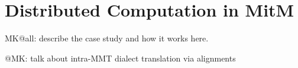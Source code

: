 \section{Distributed Computation in MitM}\label{sec:case}
\begin{todolist}{MK@all: describe the case study and how it works here.}
\item @MK: talk about intra-MMT dialect translation via alignments 
\end{todolist}



